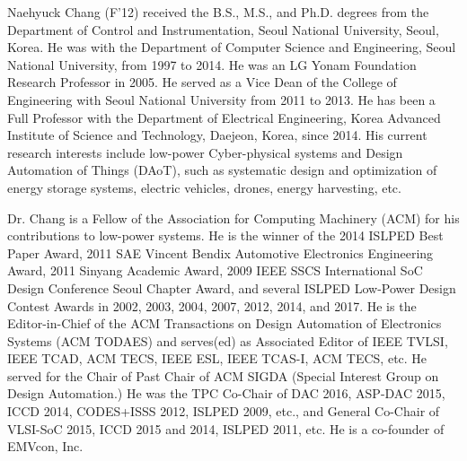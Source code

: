 \documentclass{IEEEtran}
\begin{document}
\begin{IEEEbiography}{Naehyuck Chang}
(F’12) received the B.S., M.S., and Ph.D. degrees from the Department of Control and Instrumentation, Seoul National University, Seoul, Korea. He was with the Department of Computer Science and Engineering, Seoul National University, from 1997 to 2014. He was an LG Yonam Foundation Research Professor in 2005. He served as a Vice Dean of the College of Engineering with Seoul National University from 2011 to 2013. He has been a Full Professor with the Department of Electrical Engineering, Korea Advanced Institute of Science and Technology, Daejeon, Korea, since 2014. His current research interests include low-power Cyber-physical systems and Design Automation of Things (DAoT), such as systematic design and optimization of energy storage systems, electric vehicles, drones, energy harvesting, etc.

Dr. Chang is a Fellow of the Association for Computing Machinery (ACM) for his contributions to low-power systems. He is the winner of the 2014 ISLPED Best Paper Award, 2011 SAE Vincent Bendix Automotive Electronics Engineering Award, 2011 Sinyang Academic Award, 2009 IEEE SSCS International SoC Design Conference Seoul Chapter Award, and several ISLPED Low-Power Design Contest Awards in 2002, 2003, 2004, 2007, 2012, 2014, and 2017. He is the Editor-in-Chief of the ACM Transactions on Design Automation of Electronics Systems (ACM TODAES) and serves(ed) as Associated Editor of IEEE TVLSI, IEEE TCAD, ACM TECS, IEEE ESL, IEEE TCAS-I, ACM TECS, etc. He served for the Chair of Past Chair of ACM SIGDA (Special Interest Group on Design Automation.) He was the TPC Co-Chair of DAC 2016, ASP-DAC 2015, ICCD 2014, CODES+ISSS 2012, ISLPED 2009, etc., and General Co-Chair of VLSI-SoC 2015, ICCD 2015 and 2014, ISLPED 2011, etc. He is a co-founder of EMVcon, Inc.


\end{IEEEbiography}


\end{document}
